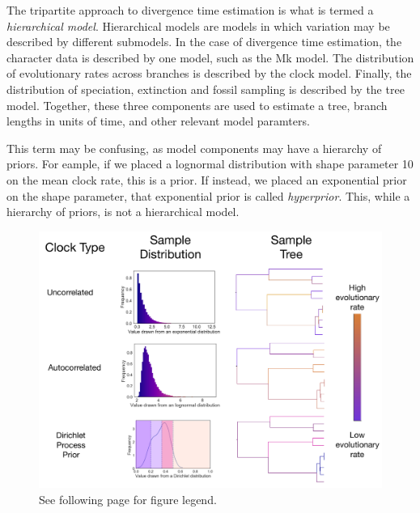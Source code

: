 \documentclass[11pt]{article}
\makeatletter
\newenvironment{boxedtext}[1]{%
  \begin{mdframed}[frametitle=#1,
    frametitlefont=\scshape\mdseries\sffamily,
    frametitlealignment=\centering,
    backgroundcolor=black!20,
    hidealllines=true,
    innerleftmargin=11\p@,innerrightmargin=11\p@,
    frametitleaboveskip=0.5\baselineskip,
    innerbottommargin=0.5\baselineskip,
    skipabove=\baselineskip,skipbelow=0.5\baselineskip]
}{%
  \end{mdframed}%
}
\makeatother
\begin{document}
\clearpage


\begin{boxedtext}{Hierarchical Models}

The tripartite approach to divergence time estimation is what is termed a \textit{hierarchical model}. 
Hierarchical models are models in which variation may be described by different submodels.
In the case of divergence time estimation, the character data is described by one model, such as the Mk model.
The distribution of evolutionary rates across branches is described by the clock model.
Finally, the distribution of speciation, extinction and fossil sampling is described by the tree model.
Together, these three components are used to estimate a tree, branch lengths in units of time, and other relevant model paramters.

This term may be confusing, as model components may have a hierarchy of priors. 
For eample, if we placed a lognormal distribution with shape parameter 10 on the mean clock rate, this is a prior.
If instead, we placed an exponential prior on the shape parameter, that exponential prior is called \textit{hyperprior}.
This, while a hierarchy of priors, is not a hierarchical model. 

\end{boxedtext}
\clearpage


\begin{figure}
\centering
\includegraphics[width=\textwidth]{figures/Distributions.pdf}
\caption{\footnotesize See following page for figure legend.
}
\label{fig:distn}
\end{figure}
\end{document}
